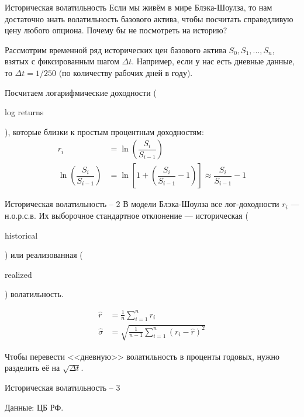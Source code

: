 \documentclass{beamer}
\newcommand{\en}[1]{\begin{otherlanguage}{english}#1\end{otherlanguage}}
\begin{document}
\begin{frame}{Историческая волатильность}
\justify
Если мы живём в мире Блэка-Шоулза, то нам достаточно знать волатильность базового актива, чтобы посчитать справедливую цену любого опциона. Почему бы не посмотреть на историю?

\justify
Рассмотрим временной ряд исторических цен базового актива $S_0,S_1,...,S_n$, взятых с фиксированным шагом $\Delta t$. Например, если у нас есть дневные данные, то $\Delta t = 1/250$ (по количеству рабочих дней в году). 

\justify
Посчитаем логарифмические доходности (\en{log returns}), которые близки к простым процентным доходностям:
\begin{align*}
r_i &= \ln \left( \dfrac{S_{i}}{S_{i-1}} \right) \\
\ln \left(\dfrac{S_{i}}{S_{i-1}} \right) &= \ln \left[1 + \left(\dfrac{S_{i}}{S_{i-1}} - 1 \right) \right] \approx \dfrac{S_{i}}{S_{i-1}} - 1
\end{align*}
\end{frame}



\begin{frame}{Историческая волатильность -- 2}
\justify
В модели Блэка-Шоулза все лог-доходности $r_i$ --- н.о.р.с.в. Их выборочное стандартное отклонение --- \alert{историческая} (\en{historical}) или \alert{реализованная} (\en{realized}) волатильность.

\begin{align*}
\hat{r} &= \frac{1}{n}\sum\limits_{i=1}^{n}r_i \\
\hat{\sigma} &= \sqrt{\frac{1}{n-1}\sum\limits_{i=1}^{n}(r_i - \hat{r})^2}
\end{align*}

\justify
Чтобы перевести <<дневную>> волатильность в проценты годовых, нужно разделить её на $\sqrt{\Delta t}$.
\end{frame}



\begin{frame}{Историческая волатильность -- 3}
\centering
{}

\scriptsize Данные: ЦБ РФ.
\end{frame}
\end{document}
